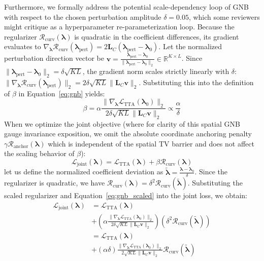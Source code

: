 Furthermore, we formally address the potential scale-dependency loop of GNB with respect to the chosen perturbation amplitude $\delta = 0.05$, which some reviewers might critique as a hyperparameter re-parameterization loop. Because the regularizer $\mathcal{R}_{\text{curv}}(\boldsymbol{\lambda})$ is quadratic in the coefficient differences, its gradient evaluates to $\nabla_{\boldsymbol{\lambda}} \mathcal{R}_{\text{curv}}(\boldsymbol{\lambda}_{\text{pert}}) = 2 \mathbf{L}_C (\boldsymbol{\lambda}_{\text{pert}} - \boldsymbol{\lambda}_0)$. Let the normalized perturbation direction vector be $\mathbf{v} = \frac{\boldsymbol{\lambda}_{\text{pert}} - \boldsymbol{\lambda}_0}{\|\boldsymbol{\lambda}_{\text{pert}} - \boldsymbol{\lambda}_0\|_2} \in \mathbb{R}^{K \times L}$. Since $\|\boldsymbol{\lambda}_{\text{pert}} - \boldsymbol{\lambda}_0\|_2 = \delta \sqrt{KL}$, the gradient norm scales strictly linearly with $\delta$: $\|\nabla_{\boldsymbol{\lambda}} \mathcal{R}_{\text{curv}}(\boldsymbol{\lambda}_{\text{pert}})\|_2 = 2 \delta \sqrt{KL} \|\mathbf{L}_C \mathbf{v}\|_2$. Substituting this into the definition of $\beta$ in Equation~\ref{eq:gnb} yields:
\begin{equation}
\label{eq:gnb_scaled}
\beta = \alpha \frac{\|\nabla_{\boldsymbol{\lambda}} \mathcal{L}_{\text{TTA}}(\boldsymbol{\lambda}_0)\|_2}{2 \delta \sqrt{KL} \|\mathbf{L}_C \mathbf{v}\|_2} \propto \frac{\alpha}{\delta}
\end{equation}
When we optimize the joint objective (where for clarity of this spatial GNB gauge invariance exposition, we omit the absolute coordinate anchoring penalty $\gamma \mathcal{R}_{\text{anchor}}(\boldsymbol{\lambda})$ which is independent of the spatial TV barrier and does not affect the scaling behavior of $\beta$):
\begin{equation}
\mathcal{L}_{\text{joint}}(\boldsymbol{\lambda}) = \mathcal{L}_{\text{TTA}}(\boldsymbol{\lambda}) + \beta \mathcal{R}_{\text{curv}}(\boldsymbol{\lambda})
\end{equation}
let us define the normalized coefficient deviation as $\tilde{\boldsymbol{\lambda}} = \frac{\boldsymbol{\lambda} - \boldsymbol{\lambda}_0}{\delta}$. Since the regularizer is quadratic, we have $\mathcal{R}_{\text{curv}}(\boldsymbol{\lambda}) = \delta^2 \mathcal{R}_{\text{curv}}(\tilde{\boldsymbol{\lambda}})$. Substituting the scaled regularizer and Equation~\ref{eq:gnb_scaled} into the joint loss, we obtain:
\begin{align}
\mathcal{L}_{\text{joint}}(\boldsymbol{\lambda}) &= \mathcal{L}_{\text{TTA}}(\boldsymbol{\lambda}) \nonumber \\
&+ \left( \alpha \frac{\|\nabla_{\boldsymbol{\lambda}} \mathcal{L}_{\text{TTA}}(\boldsymbol{\lambda}_0)\|_2}{2 \delta \sqrt{KL} \|\mathbf{L}_C \mathbf{v}\|_2} \right) \left( \delta^2 \mathcal{R}_{\text{curv}}(\tilde{\boldsymbol{\lambda}}) \right) \nonumber \\
&= \mathcal{L}_{\text{TTA}}(\boldsymbol{\lambda}) \nonumber \\
&+ (\alpha \delta) \frac{\|\nabla_{\boldsymbol{\lambda}} \mathcal{L}_{\text{TTA}}(\boldsymbol{\lambda}_0)\|_2}{2 \sqrt{KL} \|\mathbf{L}_C \mathbf{v}\|_2} \mathcal{R}_{\text{curv}}(\tilde{\boldsymbol{\lambda}})
\end{align}
